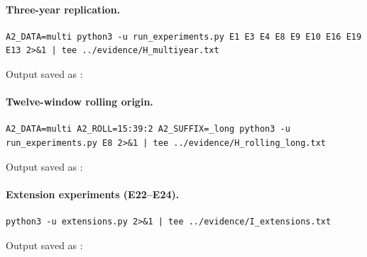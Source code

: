 \documentclass[11pt,a4paper]{report}
\begin{document}
\paragraph{Three-year replication.}
\begin{Verbatim}[fontsize=\scriptsize,breaklines,breakanywhere]
A2_DATA=multi python3 -u run_experiments.py E1 E3 E4 E8 E9 E10 E16 E19 E13 2>&1 | tee ../evidence/H_multiyear.txt
\end{Verbatim}
\noindent Output saved as :

\paragraph{Twelve-window rolling origin.}
\begin{Verbatim}[fontsize=\scriptsize,breaklines,breakanywhere]
A2_DATA=multi A2_ROLL=15:39:2 A2_SUFFIX=_long python3 -u run_experiments.py E8 2>&1 | tee ../evidence/H_rolling_long.txt
\end{Verbatim}
\noindent Output saved as :

\paragraph{Extension experiments (E22--E24).}
\begin{Verbatim}[fontsize=\scriptsize,breaklines,breakanywhere]
python3 -u extensions.py 2>&1 | tee ../evidence/I_extensions.txt
\end{Verbatim}
\noindent Output saved as :
\end{document}
